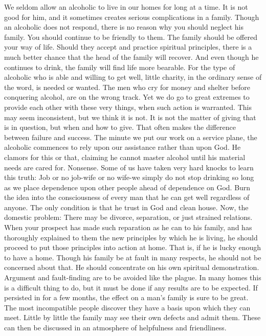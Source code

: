 \begin{biblechapter}
We seldom allow an alcoholic to live in our homes for long at a time.  It is not good for him, and it sometimes creates serious complications in a family.
Though an alcoholic does not respond, there is no reason why you should neglect his family.  You should continue to be friendly to them.  The family should be offered your way of life.  Should they accept and practice spiritual principles, there is a much better chance that the head of the family will recover.  And even though he continues to drink, the family will find life more bearable.
For the type of alcoholic who is able and willing to get well, little charity, in the ordinary sense of the word, is needed or wanted.  The men who cry for money and shelter before conquering alcohol, are on the wrong track.  Yet we do go to great extremes to provide each other with these very things, when such action is warranted.  This may seem inconsistent, but we think it is not.
It is not the matter of giving that is in question, but when and how to give.  That often makes the difference between failure and success.  The minute we put our work on a service plane, the alcoholic commences to rely upon our assistance rather than upon God.  He clamors for this or that, claiming he cannot master alcohol until his material needs are cared for.  Nonsense.  Some of us have taken very hard knocks to learn this truth: Job or no job-wife or no wife-we simply do not stop drinking so long as we place dependence upon other people ahead of dependence on God.
Burn the idea into the consciousness of every man that he can get well regardless of anyone.  The only condition is that he trust in God and clean house.
Now, the domestic problem: There may be divorce, separation, or just strained relations.  When your prospect has made such reparation as he can to his family, and has thoroughly explained to them the new principles by which he is living, he should proceed to put those principles into action at home.  That is, if he is lucky enough to have a home.  Though his family be at fault in many respects, he should not be concerned about that.  He should concentrate on his own spiritual demonstration.  Argument and fault-finding are to be avoided like the plague.  In many homes this is a difficult thing to do, but it must be done if any results are to be expected.  If persisted in for a few months, the effect on a man's family is sure to be great.  The most incompatible people discover they have a basis upon which they can meet.  Little by little the family may see their own defects and admit them.  These can then be discussed in an atmosphere of helpfulness and friendliness.

\end{biblechapter}

